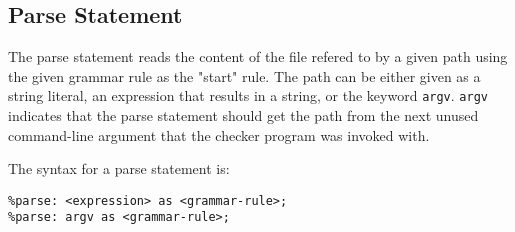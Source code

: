 
\subsection{Parse Statement}
{
	The parse statement reads the content of the file refered to by a given path
	using the given grammar rule as the "start" rule.
	The path can be either given as a
	string literal, an expression that results in a string, or the
	keyword \texttt{argv}.
	\texttt{argv} indicates that the parse statement should get the path from
	the next unused command-line argument that the checker program was invoked
	with.
	
	The syntax for a parse statement is:
	\begin{lstlisting}[numbers = none, texcl = true, language = MAIA]
%parse: "path/to/file" as <grammar-rule>;
%parse: <expression> as <grammar-rule>;
%parse: argv as <grammar-rule>;
	\end{lstlisting}
}
